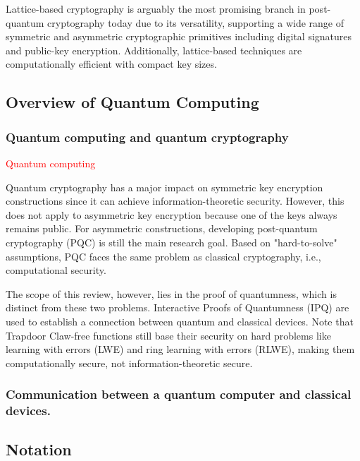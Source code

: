 \documentclass[cryptography,review,submit,pdftex,moreauthors,amsmath,amssymb,aps,strict]{Definitions/mdpi}
\begin{document}
Lattice-based cryptography is arguably the most promising branch in post-quantum cryptography today due to its versatility, supporting a wide range of symmetric and asymmetric cryptographic primitives including digital signatures and public-key encryption. Additionally, lattice-based techniques are computationally efficient with compact key sizes.

\subsection{Overview of Quantum Computing}

\subsubsection{Quantum computing and quantum cryptography}

\textcolor{red}{Quantum computing}

Quantum cryptography has a major impact on symmetric key encryption constructions since it can achieve information-theoretic security. However, this does not apply to asymmetric key encryption because one of the keys always remains public. For asymmetric constructions, developing post-quantum cryptography (PQC) is still the main research goal. Based on "hard-to-solve" assumptions, PQC faces the same problem as classical cryptography, i.e., computational security.

The scope of this review, however, lies in the proof of quantumness, which is distinct from these two problems. Interactive Proofs of Quantumness (IPQ) are used to establish a connection between quantum and classical devices. Note that Trapdoor Claw-free functions still base their security on hard problems like learning with errors (LWE) and ring learning with errors (RLWE), making them computationally secure, not information-theoretic secure.
\subsubsection{Communication between a quantum computer and classical devices.}

\subsection{Notation}
\end{document}
